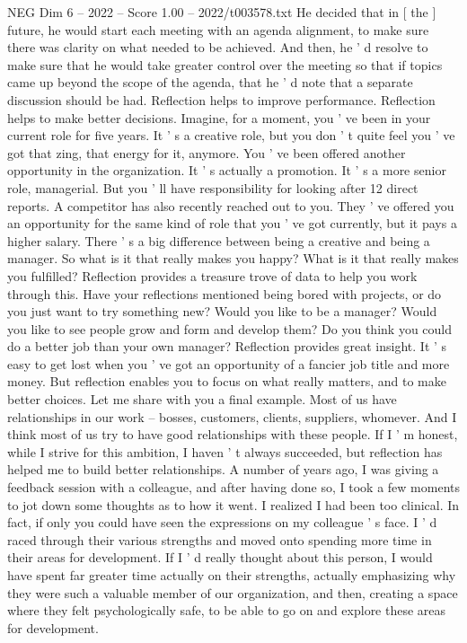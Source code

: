\begin{textsample}{NEG Dim 6 – 2022 – Score 1.00 – 2022/t003578.txt}
He decided that in [ the ] future, he would start each meeting with an agenda alignment, to make sure there was clarity on what needed to be achieved.
And then, he ' d resolve to make sure that he would take greater control over the meeting so that if topics came up beyond the scope of the agenda, that he ' d note that a separate discussion should be had.
Reflection helps to improve performance.
Reflection helps to make better decisions.
Imagine, for a moment, you ' ve been in your current role for five years.
It ' s a creative role, but you don ' t quite feel you ' ve got that zing, that energy for it, anymore.
You ' ve been offered another opportunity in the organization.
It ' s actually a promotion.
It ' s a more senior role, managerial.
But you ' ll have responsibility for looking after 12 direct reports.
A competitor has also recently reached out to you.
They ' ve offered you an opportunity for the same kind of role that you ' ve got currently, but it pays a higher salary.
There ' s a big difference between being a creative and being a manager.
So what is it that really makes you happy?
What is it that really makes you fulfilled?
Reflection provides a treasure trove of data to help you work through this.
Have your reflections mentioned being bored with projects, or do you just want to try something new?
Would you like to be a manager?
Would you like to see people grow and form and develop them?
Do you think you could do a better job than your own manager?
Reflection provides great insight.
It ' s easy to get lost when you ' ve got an opportunity of a fancier job title and more money.
But reflection enables you to focus on what really matters, and to make better choices.
Let me share with you a final example.
Most of us have relationships in our work -- bosses, customers, clients, suppliers, whomever.
And I think most of us try to have good relationships with these people.
If I ' m honest, while I strive for this ambition, I haven ' t always succeeded, but reflection has helped me to build better relationships.
A number of years ago, I was giving a feedback session with a colleague, and after having done so, I took a few moments to jot down some thoughts as to how it went.
I realized I had been too clinical.
In fact, if only you could have seen the expressions on my colleague ' s face.
I ' d raced through their various strengths and moved onto spending more time in their areas for development.
If I ' d really thought about this person, I would have spent far greater time actually on their strengths, actually emphasizing why they were such a valuable member of our organization, and then, creating a space where they felt psychologically safe, to be able to go on and explore these areas for development.

\end{textsample}

